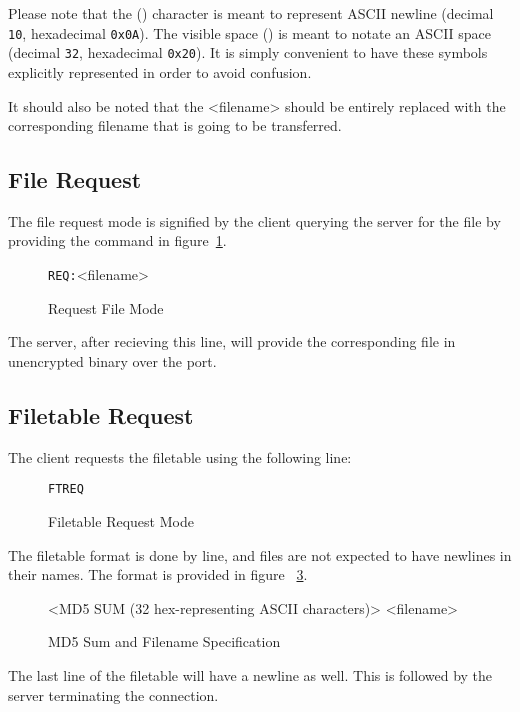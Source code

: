 \documentclass[12pt]{article}
\begin{document}
Please note that the (\carriagereturn) character is meant to represent ASCII
newline (decimal \verb+10+, hexadecimal \verb+0x0A+).  The
visible space (\textvisiblespace) is meant to notate an ASCII space (decimal
\verb+32+, hexadecimal \verb+0x20+).
It is simply convenient to have these symbols explicitly represented in order
to avoid confusion.

It should also be noted that the <filename> should be entirely replaced with
the corresponding filename that is going to be transferred.

\subsection{File Request}
\label{sec:request_file}
The file request mode is signified by the client querying the server for the
file by providing the command in figure~\ref{fig:request_file}.
\begin{figure}[H]
	\centering
	\verb+REQ:+\textvisiblespace <filename>\carriagereturn\carriagereturn
	\caption{Request File Mode}
	\label{fig:request_file}
\end{figure}

The server, after recieving this line, will provide the corresponding file in
unencrypted binary over the port.

\subsection{Filetable Request}
\label{sec:request_filetable}
The client requests the filetable using the following line:
\begin{figure}[H]
	\centering
	\verb+FTREQ+\carriagereturn\carriagereturn
	\caption{Filetable Request Mode}
	\label{fig:request_filetable}
\end{figure}

The filetable format is done by line, and files are not expected to have
newlines in their names.  The format is provided in figure~
\ref{fig:mdfive_format}.
\begin{figure}[H]
	\centering
	<MD5 SUM (32 hex-representing ASCII characters)>\textvisiblespace
	\textvisiblespace<filename>\carriagereturn
	\caption{MD5 Sum and Filename Specification}
	\label{fig:mdfive_format}
\end{figure}

The last line of the filetable will have a newline as well.  This is followed
by the server terminating the connection.
\end{document}
